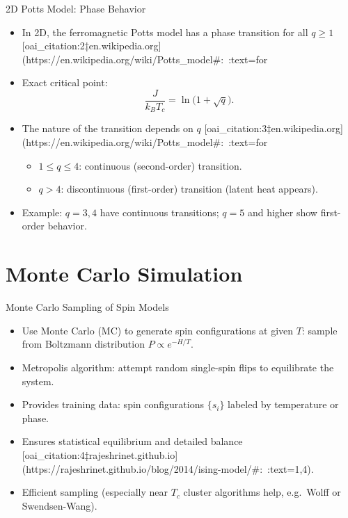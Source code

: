 \documentclass{beamer}
\begin{document}
\begin{frame}{2D Potts Model: Phase Behavior}
 \begin{itemize}
   \item In 2D, the ferromagnetic Potts model has a phase transition for all $q\ge1$ [oai_citation:2‡en.wikipedia.org](https://en.wikipedia.org/wiki/Potts_model#:~:text=for%
   \item Exact critical point:
     \[
       \frac{J}{k_B T_c} = \ln\!\bigl(1+\sqrt{q}\bigr).
     \]
   \item The nature of the transition depends on $q$ [oai_citation:3‡en.wikipedia.org](https://en.wikipedia.org/wiki/Potts_model#:~:text=for%
     \begin{itemize}
       \item $1 \le q \le 4$: continuous (second-order) transition.
       \item $q > 4$: discontinuous (first-order) transition (latent heat appears).
     \end{itemize}
   \item Example: $q=3,4$ have continuous transitions; $q=5$ and higher show first-order behavior.
 \end{itemize}
\end{frame}

\section{Monte Carlo Simulation}

\begin{frame}{Monte Carlo Sampling of Spin Models}
 \begin{itemize}
   \item Use Monte Carlo (MC) to generate spin configurations at given $T$:
     sample from Boltzmann distribution $P\propto e^{-H/T}$.
   \item Metropolis algorithm: attempt random single-spin flips to equilibrate the system.
   \item Provides training data: spin configurations $\{s_i\}$ labeled by temperature or phase.
   \item Ensures statistical equilibrium and detailed balance [oai_citation:4‡rajeshrinet.github.io](https://rajeshrinet.github.io/blog/2014/ising-model/#:~:text=1,4).
   \item Efficient sampling (especially near $T_c$ cluster algorithms help, e.g.\ Wolff or Swendsen-Wang).
 \end{itemize}
\end{frame}
\end{document}
